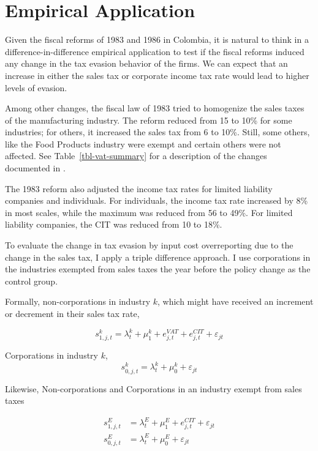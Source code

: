 \documentclass[
  12pt]{article}
\theoremstyle{definition}
\theoremstyle{remark}
\begin{document}
\section{Empirical Application}\label{empirical-application}

Given the fiscal reforms of 1983 and 1986 in Colombia, it is natural to
think in a difference-in-difference empirical application to test if the
fiscal reforms induced any change in the tax evasion behavior of the
firms. We can expect that an increase in either the sales tax or
corporate income tax rate would lead to higher levels of evasion.

Among other changes, the fiscal law of 1983 tried to homogenize the
sales taxes of the manufacturing industry. The reform reduced from 15 to
10\% for some industries; for others, it increased the sales tax from 6
to 10\%. Still, some others, like the Food Products industry were exempt
and certain others were not affected. See Table~\ref{tbl-vat-summary}
for a description of the changes documented in \citet{Perry1990}.

The 1983 reform also adjusted the income tax rates for limited liability
companies and individuals. For individuals, the income tax rate
increased by 8\% in most scales, while the maximum was reduced from 56
to 49\%. For limited liability companies, the CIT was reduced from 10 to
18\%.

To evaluate the change in tax evasion by input cost overreporting due to
the change in the sales tax, I apply a triple difference approach. I use
corporations in the industries exempted from sales taxes the year before
the policy change as the control group.

Formally, non-corporations in industry \(k\), which might have received
an increment or decrement in their sales tax rate,

\[
s_{1,j,t}^k=\lambda^k_t+\mu^k_1+e^{VAT}_{j,t}+e^{CIT}_{j,t}+\varepsilon_{jt}
\]

Corporations in industry \(k\), \[
s_{0,j,t}^k=\lambda^k_t+\mu^k_0+\varepsilon_{jt}
\]

Likewise, Non-corporations and Corporations in an industry exempt from
sales taxes

\[
\begin{aligned}
    s_{1,j,t}^{E}&=\lambda^{E}_t+\mu^E_1+e^{CIT}_{j,t}+\varepsilon_{jt}\\
    s_{0,j,t}^E&=\lambda^E_t+\mu^E_0+\varepsilon_{jt}
\end{aligned}
\]
\end{document}
